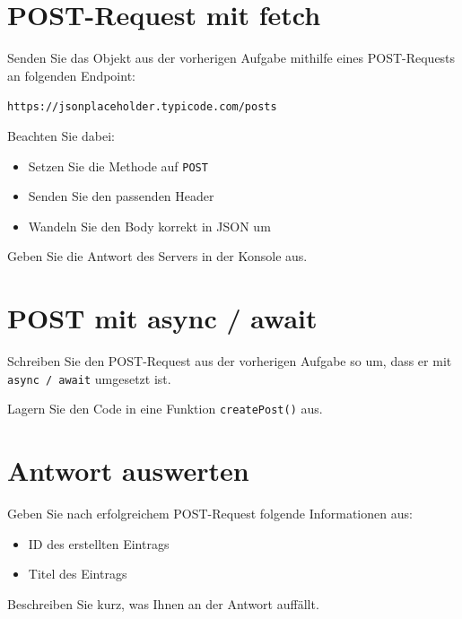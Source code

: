 \documentclass[a4paper,12pt]{article}
\begin{document}
\section{POST-Request mit fetch}

Senden Sie das Objekt aus der vorherigen Aufgabe mithilfe eines POST-Requests an folgenden Endpoint:

\texttt{https://jsonplaceholder.typicode.com/posts}

Beachten Sie dabei:
\begin{itemize}
    \item Setzen Sie die Methode auf \texttt{POST}
    \item Senden Sie den passenden Header
    \item Wandeln Sie den Body korrekt in JSON um
\end{itemize}

Geben Sie die Antwort des Servers in der Konsole aus.

\section{POST mit async / await}

Schreiben Sie den POST-Request aus der vorherigen Aufgabe so um, dass er mit \texttt{async / await} umgesetzt ist.

Lagern Sie den Code in eine Funktion \texttt{createPost()} aus.

\section{Antwort auswerten}

Geben Sie nach erfolgreichem POST-Request folgende Informationen aus:
\begin{itemize}
    \item ID des erstellten Eintrags
    \item Titel des Eintrags
\end{itemize}

Beschreiben Sie kurz, was Ihnen an der Antwort auffällt.
\end{document}
